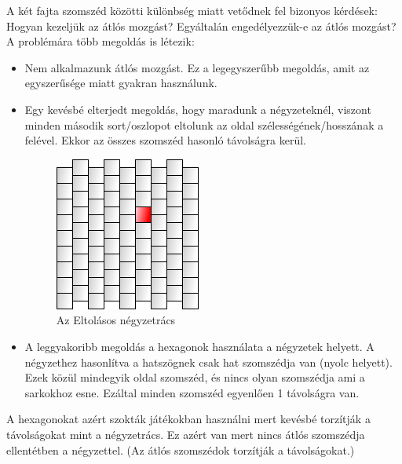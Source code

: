 \noindent A két fajta szomszéd közötti különbség miatt vetődnek fel bizonyos kérdések:
\newline
\newline Hogyan kezeljük az átlós mozgást? 
\newline Egyáltalán engedélyezzük-e az átlós mozgást? 
\newline
\newline A problémára több megoldás is létezik:

\begin{itemize}
\item Nem alkalmazunk átlós mozgást. Ez a legegyszerűbb megoldás, amit az egyszerűsége miatt gyakran használunk.
\item Egy kevésbé elterjedt megoldás, hogy maradunk a négyzeteknél, viszont minden második sort/oszlopot eltolunk az oldal szélességének/hosszának a felével. Ekkor az összes szomszéd hasonló távolságra kerül.

\begin{figure}[h]
\centering
\includegraphics[scale=0.4]{kepek/img22.png}
\caption{Az Eltolásos négyzetrács}
\label{fig:img22}
\end{figure}

\item A leggyakoribb megoldás a hexagonok használata a négyzetek helyett. A négyzethez hasonlítva a hatszögnek csak hat szomszédja van (nyolc helyett). Ezek közül mindegyik oldal szomszéd, és nincs olyan szomszédja ami a sarkokhoz esne. Ezáltal minden szomszéd egyenlően 1 távolságra van.
\end{itemize}

\noindent A hexagonokat azért szokták játékokban használni mert kevésbé torzítják a távolságokat mint a négyzetrács. Ez azért van mert nincs átlós szomszédja ellentétben a négyzettel. (Az átlós szomszédok torzítják a távolságokat.)

